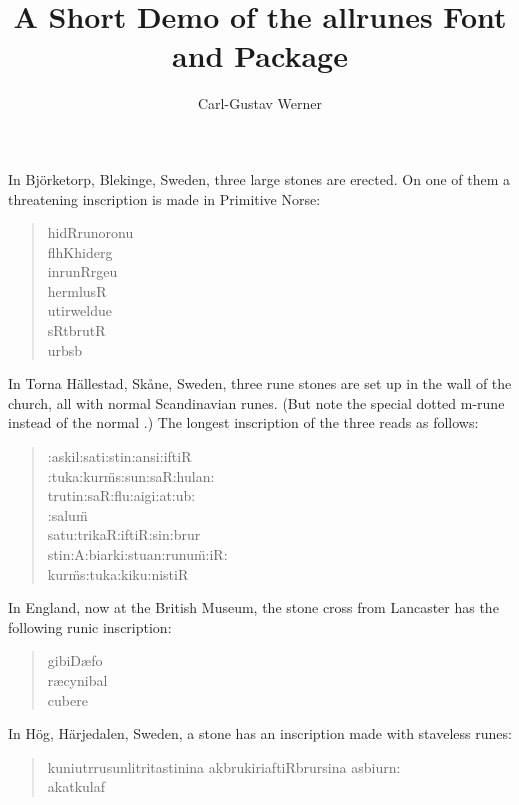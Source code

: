 \documentclass{article}
\title{A Short Demo of the \textsf{allrunes} Font and Package}
\author{Carl-Gustav Werner}
\begin{document}
\maketitle
In Bj\"orketorp, Blekinge, Sweden, three
large stones are erected. On one of them a threatening
inscription is made in Primitive Norse:
\begin{quotation}
\noindent
{\arcfamily  \large
h\A idRrunoronu\\
f\A l\A h\A Kh\A ider\A g\\
in\A run\A R\A r\A geu\\
h\A er\A m\A l\A usR\\
uti\A rwel\A d\A ue\\
s\A R\th \A tb\A rutR\\
u\th\A r\A b\A sb\A}
\end{quotation}

In Torna H\"allestad, Sk\r ane, Sweden, three rune stones are set up
in the wall of the church, all with normal Scandinavian runes. (But note the
special dotted m-rune  instead of the normal .)
The longest inscription of the three reads as follows:
\begin{quotation}
\noindent
{\arnfamily  \large
:askil:sati:stin:\th ansi:iftiR\\
:tuka:kur\"ms:sun:saR:hulan:\\
trutin:saR:flu:aigi:at:ub:\\
:salu\"m\\
satu:trikaR:iftiR:sin:bru\th r\\
stin:A:biarki:stu\th an:runu\"m:\th iR:\\
kur\"ms:tuka:kiku:nistiR}
\end{quotation}

In England, now at the British Museum, the stone cross from Lancaster
has the following runic inscription:
\begin{quotation}
\noindent
{\arafamily  \large
gibiD\ae\th fo\\
r\ae cynibal\\
\th cu\th bere}
\end{quotation}

In H\"og, H\"arjedalen, Sweden, a stone has an inscription made with staveless runes:
\begin{quotation}
\noindent
{\arlfamily \large \withlines
ku\th niutr\tripledot \th rusun\tripledot litritastin\th ina
\tripledot akbrukir\th i\tripledot aftiRbru\th rsina\tripledot
asbiurn:\\
akatku\th laf}
\end{quotation}
\end{document}
